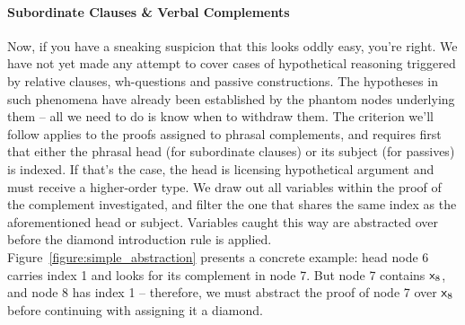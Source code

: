 \paragraph{Subordinate Clauses \& Verbal Complements}
Now, if you have a sneaking suspicion that this looks oddly easy, you're right.
We have not yet made any attempt to cover cases of hypothetical reasoning triggered by relative clauses, wh-questions and passive constructions.
The hypotheses in such phenomena have already been established by the phantom nodes underlying them -- all we need to do is know when to withdraw them.
The criterion we'll follow applies to the proofs assigned to phrasal complements, and requires first that either the phrasal head (for subordinate clauses) or its subject (for passives) is indexed.
If that's the case, the head is licensing hypothetical argument and must receive a higher-order type.
We draw out all variables within the proof of the complement investigated, and filter the one that shares the same index as the aforementioned head or subject.
Variables caught this way are abstracted over before the diamond introduction rule is applied.
Figure~\ref{figure:simple_abstraction} presents a concrete example: head node 6 carries index 1 and looks for its complement in node 7.
But node 7 contains $\mathsf{x}_{\mathnormal{8}}$, and node 8 has index 1 -- therefore, we must abstract the proof of node 7 over $\mathsf{x}_{\mathnormal{8}}$ before continuing with assigning it a diamond.

